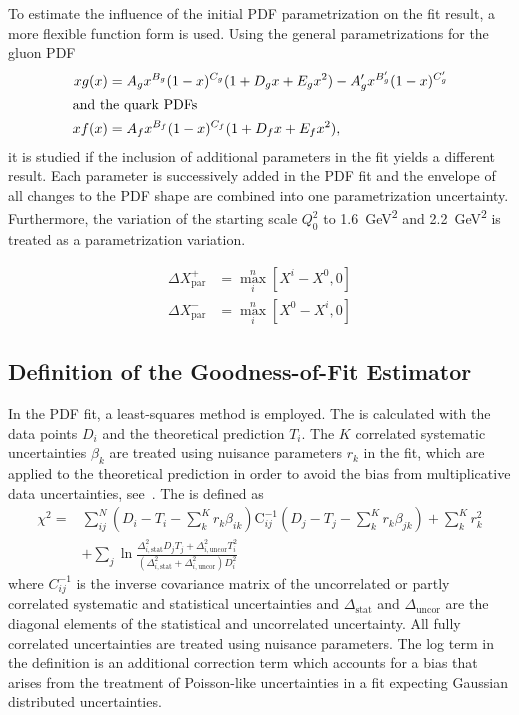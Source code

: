 To estimate the influence of the initial PDF parametrization on the fit result, a
more flexible function form is used. Using the general
parametrizations for the gluon PDF
%
\begin{align*}
   xg(x) &= A_g x^{B_g} (1-x)^{C_g} (1  + D_g x + E_g x^2) - A'_g x^{B'_g} (1-x)^{C'_g}\\
\intertext{and the quark PDFs}
   xf(x) &= A_{f}  x^{B_{f}} (1-x)^{C_{f}} (1 + D_{f}x + E_{f}x^2),
\end{align*}
%
it is studied if the inclusion of additional parameters in the fit yields
a different result. Each parameter is successively added in the PDF fit and the
envelope of all changes to the PDF shape are combined into one parametrization
uncertainty. Furthermore, the variation of the starting scale $Q_0^2$ to
\SI{1.6}{\GeV\squared} and \SI{2.2}{\GeV\squared} is treated as a
parametrization variation.

\begin{align*}
  \Delta X^+_{\mathrm{par}} &= \max_{i}^{n} \left[ X^i - X^0, 0 \right]\\
  \Delta X^-_{\mathrm{par}} &= \max_{i}^{n} \left[ X^0 - X^i, 0 \right]
\end{align*}


\subsection{Definition of the Goodness-of-Fit Estimator}
\label{sec:chi2_definition}

In the PDF fit, a least-squares method is employed. The \chisq is
calculated with the data points $D_i$ and the theoretical prediction $T_i$. The
$K$ correlated systematic uncertainties $\beta_{k}$ are treated using nuisance parameters
$r_k$ in the fit, which are applied to the theoretical prediction in order to avoid the bias from
multiplicative data uncertainties, see~\cite{Lyons:1989gh}. The \chisq is
defined as
%
\begin{align*}
  \chi^2 = &\sum_{ij}^N \left(D_i - T_i - \sum_k^K r_k \beta_{ik}\right) \mathrm{C}_{ij}^{-1}
  \left(D_j - T_j - \sum_k^K r_k \beta_{jk} \right) + \sum_k^K r_k^2\\
  &+ \sum_j \ln \frac{\Delta_{i,\mathrm{stat}}^2 D_j T_j + \Delta_{i,\mathrm{uncor}}^2 T_i^2}{\left( \Delta_{i,\mathrm{stat}}^2 + \Delta_{i,\mathrm{uncor}}^2 \right) D_i^2}
  \label{chi2_nuisance}
\end{align*}
%
where $C_{ij}^{-1}$ is the inverse covariance matrix of the uncorrelated or
partly correlated systematic and statistical uncertainties and $\Delta_\mathrm{stat}$ and
$\Delta_\mathrm{uncor}$ are the diagonal elements of the statistical and
uncorrelated uncertainty. All fully correlated uncertainties are treated using
nuisance parameters. The log term in the \chisq definition is an additional
correction term which accounts for a bias that arises from the treatment of
Poisson-like uncertainties in a \chisq fit expecting Gaussian distributed
uncertainties.


